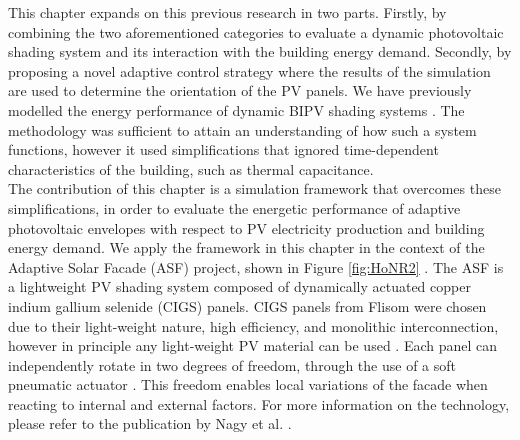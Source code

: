 
This chapter expands on this previous research in two parts. Firstly, by combining the two aforementioned categories to evaluate a dynamic photovoltaic shading system and its interaction with the building energy demand. Secondly, by proposing a novel adaptive control strategy where the results of the simulation are used to determine the orientation of the PV panels. We have previously modelled the energy performance of dynamic BIPV shading systems \cite{jayathissa2016PVSEC}. The methodology was sufficient to attain an understanding of how such a system functions, however it used simplifications that ignored time-dependent characteristics of the building, such as thermal capacitance. \\


The contribution of this chapter is a simulation framework that overcomes these simplifications, in order to evaluate the energetic performance of adaptive photovoltaic envelopes with respect to PV electricity production and building energy demand. We apply the framework in this chapter in the context of the Adaptive Solar Facade (ASF) project, shown in Figure \ref{fig:HoNR2} \cite{nagy2016adaptive}. The ASF is a lightweight PV shading system composed of dynamically actuated copper indium gallium selenide (CIGS) panels. CIGS panels from Flisom were chosen due to their light-weight nature, high efficiency, and monolithic interconnection, however in principle any light-weight PV material can be used \cite{feurer2016progress}. Each panel can independently rotate in two degrees of freedom, through the use of a soft pneumatic actuator \cite{svetozarevic2016soro}. This freedom enables local variations of the facade when reacting to internal and external factors.  For more information on the technology, please refer to the publication by Nagy et al. \cite{nagy2016adaptive}.\\

